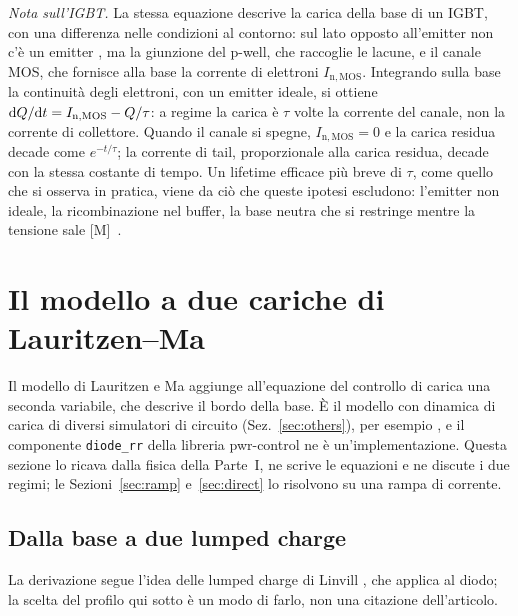 \documentclass[10pt,a4paper]{scrartcl}
\let\newcommand\pdvaluedefine
\newcommand{\diff}{\mathrm{d}}
\newcommand{\Pp}{p\textsuperscript{+}}
\newcommand{\Np}{n\textsuperscript{+}}
\begin{document}
\emph{Nota sull'IGBT.} La stessa equazione descrive la carica della base di un IGBT, con una differenza nelle condizioni al contorno: sul lato opposto all'emitter \Pp{} non c'è un emitter \Np, ma la giunzione del p-well, che raccoglie le lacune, e il canale MOS, che fornisce alla base la corrente di elettroni $I_\mathrm{n,MOS}$. Integrando sulla base la continuità degli elettroni, con un emitter \Pp{} ideale, si ottiene $\diff Q/\diff t = I_\mathrm{n,MOS} - Q/\tau$: a regime la carica è $\tau$ volte la corrente del canale, non la corrente di collettore. Quando il canale si spegne, $I_\mathrm{n,MOS} = 0$ e la carica residua decade come $e^{-t/\tau}$; la corrente di tail, proporzionale alla carica residua, decade con la stessa costante di tempo. Un lifetime efficace più breve di $\tau$, come quello che si osserva in pratica, viene da ciò che queste ipotesi escludono: l'emitter non ideale, la ricombinazione nel buffer, la base neutra che si restringe mentre la tensione sale [M]~\cite{baliga}.
\section{Il modello a due cariche di Lauritzen--Ma}
\label{sec:model}
Il modello di Lauritzen e Ma \cite{lauritzen1991} aggiunge all'equazione del controllo di carica una seconda variabile, che descrive il bordo della base. È il modello con dinamica di carica di diversi simulatori di circuito (Sez.~\ref{sec:others}), per esempio \cite{mathworks}, e il componente \texttt{diode\_rr} della libreria pwr-control ne è un'implementazione. Questa sezione lo ricava dalla fisica della Parte~I, ne scrive le equazioni e ne discute i due regimi; le Sezioni~\ref{sec:ramp} e~\ref{sec:direct} lo risolvono su una rampa di corrente.

\subsection{Dalla base a due lumped charge}
\label{sec:lumped}
La derivazione segue l'idea delle lumped charge di Linvill \cite{linvill1958}, che \cite{lauritzen1991} applica al diodo; la scelta del profilo qui sotto è un modo di farlo, non una citazione dell'articolo.
\end{document}
